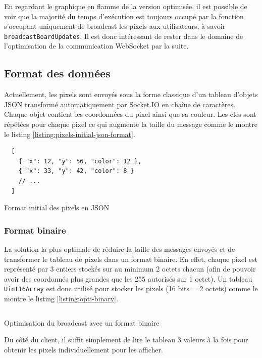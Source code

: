 En regardant le graphique en flamme de la version optimisée, il est possible de voir que la majorité du temps d'exécution est toujours occupé par la fonction s'occupant uniquement de broadcast les pixels aux utilisateurs, à savoir \texttt{broadcastBoardUpdates}. Il est donc intéressant de rester dans le domaine de l'optimisation de la communication WebSocket par la suite.

\subsection{Format des données}

Actuellement, les pixels sont envoyés sous la forme classique d'un tableau d'objets JSON transformé automatiquement par Socket.IO en chaîne de caractères. Chaque objet contient les coordonnées du pixel ainsi que sa couleur. Les clés sont répétées pour chaque pixel ce qui augmente la taille du message comme le montre le listing \ref{listing:pixels-initial-json-format}.

\begin{listing}[H]
  \begin{verbatim}
  [
    { "x": 12, "y": 56, "color": 12 },
    { "x": 33, "y": 42, "color": 8 }
    // ...
  ]
\end{verbatim}
  \caption{Format initial des pixels en JSON}
  \label{listing:pixels-initial-json-format}
\end{listing}

\subsubsection{Format binaire}

La solution la plus optimale de réduire la taille des messages envoyés et de transformer le tableau de pixels dans un format binaire. En effet, chaque pixel est représenté par 3 entiers stockés sur au minimum 2 octets chacun (afin de pouvoir avoir des coordonnés plus grandes que les 255 autorisés sur 1 octet). Un tableau \texttt{Uint16Array} est donc utilisé pour stocker les pixels (16 bits = 2 octets) comme le montre le listing \ref{listing:opti-binary}.

\begin{listing}[H]
  \inputminted[highlightlines={9}, linenos]{ts}{assets/figures/opti-binary.ts}
  \caption{Optimisation du broadcast avec un format binaire}
  \label{listing:opti-binary}
\end{listing}

Du côté du client, il suffit simplement de lire le tableau 3 valeurs à la fois pour obtenir les pixels individuellement pour les afficher.

